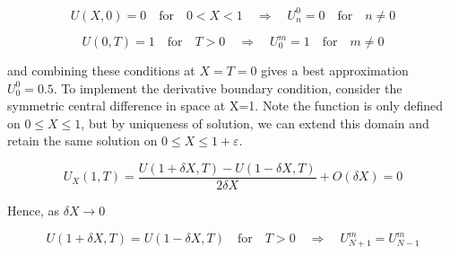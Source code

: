 \documentclass[10pt,a4paper]{report}
\begin{document}
\begin{equation*}
U(X,0) = 0 \quad \text{for} \quad 0<X<1 \quad  \Rightarrow \quad  U_n^0 = 0 \quad \text{for} \quad n \neq 0
\end{equation*}

\begin{equation*}
U(0,T) = 1 \quad \text{for} \quad T> 0 \quad  \Rightarrow \quad  U_0^m = 1 \quad \text{for} \quad m \neq 0
\end{equation*}

and combining these conditions at $X=T=0$ gives a best approximation $U_0^0=0.5$. To implement the derivative boundary condition, consider the symmetric central difference in space at X=1. Note the function is only defined on $0\leq X\leq 1$, but by uniqueness of solution, we can extend this domain and retain the same solution on $0 \leq X \leq 1+ \varepsilon$.

\begin{equation*}
U_X(1,T) = \frac{U(1+\delta X,T) - U(1-\delta X,T)}{2\delta X} + O(\delta X) = 0
\end{equation*}

Hence, as $\delta X \to 0$

\begin{equation*}
U(1+\delta X,T) = U(1-\delta X,T) \quad \text{for} \quad T>0 \quad \Rightarrow \quad U_{N+1}^m=U_{N-1}^m
\end{equation*}

\vspace{2cm}
\end{document}
